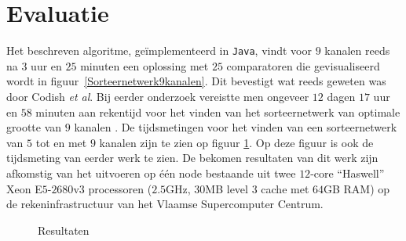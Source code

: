 \documentclass{article}
\begin{document}
\section{Evaluatie}
Het beschreven algoritme, ge\"implementeerd in \texttt{Java}, vindt voor $9$ kanalen reeds na $3$ uur en $25$ minuten een oplossing met $25$ comparatoren die gevisualiseerd wordt in figuur~\ref{Sorteernetwerk9kanalen}.
Dit bevestigt wat reeds geweten was door Codish \textit{et al}. 
Bij eerder onderzoek vereistte men ongeveer $12$ dagen $17$ uur en $58$ minuten aan rekentijd voor het vinden van het sorteernetwerk van optimale grootte van $9$ kanalen \cite{sortingNetworksSize2014}.
De tijdsmetingen voor het vinden van een sorteernetwerk van $5$ tot en met $9$ kanalen zijn te zien op figuur \ref{Tijdsresultaten}. Op deze figuur is ook de tijdsmeting van eerder werk te zien.
De bekomen resultaten van dit werk zijn afkomstig van het uitvoeren op \'e\'en node bestaande uit twee $12$-core ``Haswell'' Xeon E$5$-$2680$v$3$ processoren ($2.5$GHz, $30$MB level $3$ cache met $64$GB RAM) op de rekeninfrastructuur van het Vlaamse Supercomputer Centrum.
\begin{figure}[!h]
\centering
{}
\caption{Resultaten}
\label{Tijdsresultaten}
\end{figure}
\end{document}

